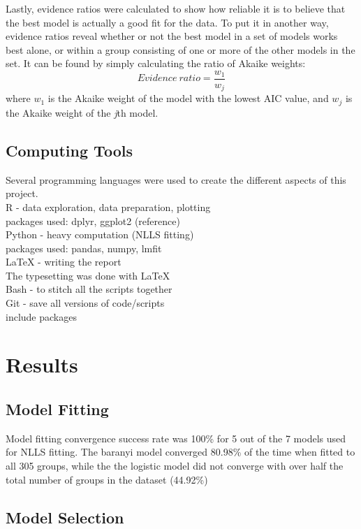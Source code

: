 \documentclass[11pt]{article}
\begin{document}
\begin{linenumbers}
	\par Lastly, evidence ratios were calculated to show how reliable it is to believe that the best model is actually a good fit for the data. To put it in another way, evidence ratios reveal whether or not the best model in a set of models works best alone, or within a group consisting of one or more of the other models in the set. It can be found by simply calculating the ratio of Akaike weights:
	\begin{equation}
		Evidence\ ratio = \frac{w_1}{w_j}
	\end{equation}
	where $w_1$ is the Akaike weight of the model with the lowest AIC value, and $w_j$ is the Akaike weight of the \emph{j}th model.
	
	\subsection{Computing Tools}
	Several programming languages were used to create the different aspects of this project.\\
	R - data exploration, data preparation, plotting\\
	packages used: dplyr, ggplot2 (reference)\\
	Python - heavy computation (NLLS fitting)\\
	packages used: pandas, numpy, lmfit\\
	{\LaTeX} - writing the report\\
	The typesetting was done with LaTeX\\
	Bash - to stitch all the scripts together\\
	Git - save all versions of code/scripts\\
	include packages\\

	\section{Results}
	\subsection{Model Fitting}
	Model fitting convergence success rate was 100\% for 5 out of the 7 models used for NLLS fitting. The baranyi model converged 80.98\% of the time when fitted to all 305 groups, while the the logistic model did  not converge with over half the total number of groups in the dataset (44.92\%)
	
	\subsection{Model Selection}
	

\end{linenumbers}
\end{document}

